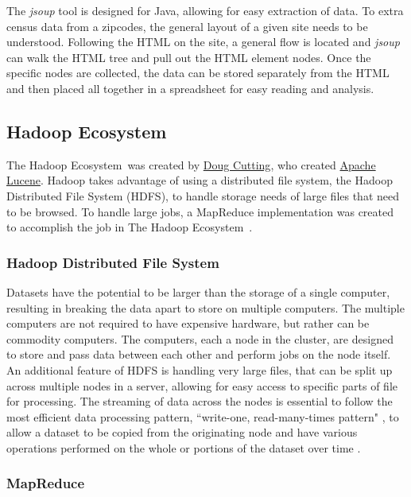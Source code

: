 \documentclass[titlepage,twocolumn]{article}
\newcommand{\HadoopEcosystem}{Hadoop Ecosystem}
\begin{document}
\par The \emph{jsoup} tool is designed for Java, allowing for easy extraction of data. To extra census data from a zipcodes, the general layout of a given site needs to be understood. Following the HTML on the site, a general flow is located and \emph{jsoup} can walk the HTML tree and pull out the HTML element nodes. Once the specific nodes are collected, the data can be stored separately from the HTML and then placed all together in a spreadsheet for easy reading and analysis. 

\subsection{\HadoopEcosystem}
\label{sec:hadoopEcosystem}

\par The \HadoopEcosystem\ was created by \href{http://hadoop.apache.org/}{Doug Cutting}, who created \href{http://lucene.apache.org/}{Apache Lucene}. Hadoop takes advantage of using a distributed file system, the Hadoop Distributed File System (HDFS), to handle storage needs of large files that need to be browsed. To handle large jobs, a MapReduce implementation was created to accomplish the job in The \HadoopEcosystem\ \cite{white_2015:Ch1}. %

\subsubsection{Hadoop Distributed File System}

Datasets have the potential to be larger than the storage of a single computer, resulting in breaking the data apart to store on multiple computers. The multiple computers are not required to have expensive hardware, but rather can be commodity computers. The computers, each a node in the cluster, are designed to store and pass data between each other and perform jobs on the node itself. An additional feature of HDFS is handling very large files, that can be split up across multiple nodes in a server, allowing for easy access to specific parts of file for processing. The streaming of data across the nodes is essential to follow the most efficient data processing pattern, ``write-one, read-many-times pattern" \cite{white_2015:Ch2Pg44}, to allow a dataset to be copied from the originating node and have various operations performed on the whole or portions of the dataset over time \cite{white_2015:Ch2}. %

\subsubsection{MapReduce}
\end{document}
